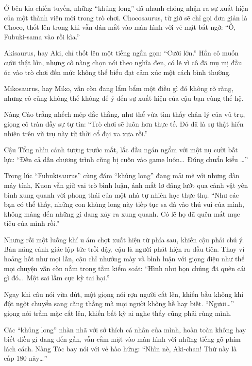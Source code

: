 \documentclass[../main.tex]{subfiles}
\begin{document}
Ở bên kia chiến tuyến, những ``khủng long'' đã nhanh chóng nhận ra sự xuất hiện của một thành viên mới trong trò chơi. Chocosaurus, từ giờ sẽ chỉ gọi đơn giản là Choco, thốt lên trong khi vẫn dán mắt vào màn hình với vẻ mặt bất ngờ: ``Ồ, Fubuki-sama vào rồi kìa.''

Akisaurus, hay Aki, chỉ thốt lên một tiếng ngắn gọn: ``Cười lớn.'' Hẳn cô muốn cười thật lớn, nhưng cô nàng chọn nói theo nghĩa đen, có lẽ vì cô đã mụ mị đầu óc vào trò chơi đến mức không thể biểu đạt cảm xúc một cách bình thường.

Mikosaurus, hay Miko, vẫn còn đang lẩm bẩm một điều gì đó không rõ ràng, nhưng cô cũng không thể không để ý đến sự xuất hiện của cậu bạn cùng thế hệ.

Nàng Cáo trắng nhếch mép đắc thắng, như thể vừa tìm thấy chân lý của vũ trụ, giọng cô tràn đầy sự tự tin: ``Trò chơi sẽ luôn hơn thực tế. Đó đã là sự thật hiển nhiên trên vũ trụ này từ thời cổ đại xa xưa rồi.''

Cậu Tổng nhìn cảnh tượng trước mắt, lắc đầu ngán ngẩm với một nụ cười bất lực: ``Đến cả dẫn chương trình cũng bị cuốn vào game luôn\dots\ Đúng chuẩn kiểu \hll\dots''

Trong lúc ``Fubukisaurus'' cùng đám ``khủng long'' đang mải mê với những dàn máy tính, Kuon vẫn giữ vai trò bình luận, ánh mắt lơ đãng lướt qua cảnh vật yên bình xung quanh với phong thái của một nhà tự nhiên học thực thụ. ``Như các bạn có thể thấy, những con khủng long này tiếp tục sa đà vào thú vui của mình, không màng đến những gì đang xảy ra xung quanh. Có lẽ họ đã quên mất mục tiêu của mình rồi.''

Nhưng rồi một luồng khí u ám chợt xuất hiện từ phía sau, khiến cậu phải chú ý. Bản năng cảnh giác lập tức trỗi dậy, cậu là người phát hiện ra đầu tiên. Thay vì hoảng hốt như mọi lần, cậu chỉ nhướng mày và bình luận với giọng điệu như thể mọi chuyện vẫn còn nằm trong tầm kiểm soát: ``Hình như bọn chúng đã quên cái gì đó\dots\ Một sai lầm cực kỳ tai hại.''

Ngay khi câu nói vừa dứt, một giọng nói rợn người cất lên, khiến bầu không khí đột ngột chuyển sang căng thẳng mà mọi người không hề hay biết. ``Ngươi\dots'' giọng nói trầm mặc cất lên, khiến bất kỳ ai nghe thấy cũng phải rùng mình.

Các ``khủng long'' nhàn nhã với sở thích cá nhân của mình, hoàn toàn không hay biết điều gì đang đến gần, vẫn cắm mặt vào màn hình với những tiếng gõ phím lách cách. Nàng Tóc bay nói với vẻ hào hứng: ``Nhìn nè, Aki-chan! Thứ này là cấp 180 này\dots''
\end{document}
